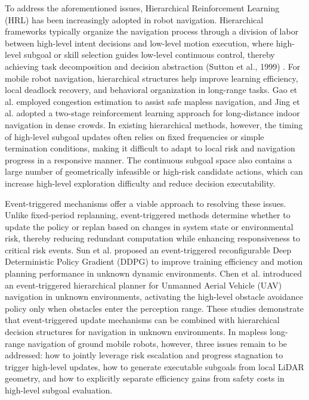 To address the aforementioned issues, Hierarchical Reinforcement Learning (HRL) has been increasingly adopted in robot navigation. Hierarchical frameworks typically organize the navigation process through a division of labor between high-level intent decisions and low-level motion execution, where high-level subgoal or skill selection guides low-level continuous control, thereby achieving task decomposition and decision abstraction (Sutton et al., 1999) \cite{12}. For mobile robot navigation, hierarchical structures help improve learning efficiency, local deadlock recovery, and behavioral organization in long-range tasks. Gao et al. \cite{13} employed congestion estimation to assist safe mapless navigation, and Jing et al. \cite{14} adopted a two-stage reinforcement learning approach for long-distance indoor navigation in dense crowds. In existing hierarchical methods, however, the timing of high-level subgoal updates often relies on fixed frequencies or simple termination conditions, making it difficult to adapt to local risk and navigation progress in a responsive manner. The continuous subgoal space also contains a large number of geometrically infeasible or high-risk candidate actions, which can increase high-level exploration difficulty and reduce decision executability.

Event-triggered mechanisms offer a viable approach to resolving these issues. Unlike fixed-period replanning, event-triggered methods determine whether to update the policy or replan based on changes in system state or environmental risk, thereby reducing redundant computation while enhancing responsiveness to critical risk events. Sun et al. \cite{15} proposed an event-triggered reconfigurable Deep Deterministic Policy Gradient (DDPG) to improve training efficiency and motion planning performance in unknown dynamic environments. Chen et al. \cite{16} introduced an event-triggered hierarchical planner for Unmanned Aerial Vehicle (UAV) navigation in unknown environments, activating the high-level obstacle avoidance policy only when obstacles enter the perception range. These studies demonstrate that event-triggered update mechanisms can be combined with hierarchical decision structures for navigation in unknown environments. In mapless long-range navigation of ground mobile robots, however, three issues remain to be addressed: how to jointly leverage risk escalation and progress stagnation to trigger high-level updates, how to generate executable subgoals from local LiDAR geometry, and how to explicitly separate efficiency gains from safety costs in high-level subgoal evaluation.

